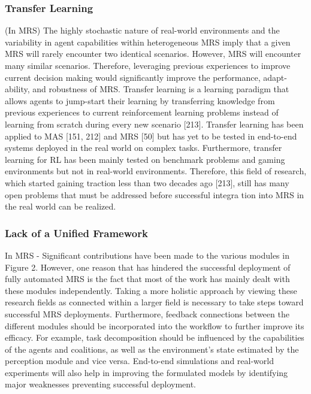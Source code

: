 \documentclass{article}
\begin{document}
				\subsubsection{Transfer Learning} 
				(In MRS) The highly stochastic nature of real-world environments and the variability in agent capabilities within heterogeneous MRS imply that a given MRS will rarely encounter two identical scenarios. However, MRS will encounter many similar scenarios. Therefore, leveraging previous experiences to improve current decision making would significantly improve the performance, adapt-
				ability, and robustness of MRS. Transfer learning is a learning paradigm that allows agents to jump-start their learning by transferring knowledge from previous experiences to current reinforcement learning problems instead of learning from scratch during every new scenario \cite{rizk-2019-cooperative-heterogeneous-multi-robot-systems-a-survey}[213]. Transfer learning has been applied to MAS \cite{rizk-2019-cooperative-heterogeneous-multi-robot-systems-a-survey}[151, 212] and MRS \cite{rizk-2019-cooperative-heterogeneous-multi-robot-systems-a-survey}[50] but has yet to be tested in
				end-to-end systems deployed in the real world on complex tasks. Furthermore, transfer learning for RL has been mainly tested on benchmark problems and gaming environments but not in real-world environments. Therefore, this field of research, which started gaining traction less than two decades ago \cite{rizk-2019-cooperative-heterogeneous-multi-robot-systems-a-survey}[213], still has many open problems that must be addressed before successful integra	tion into MRS in the real world can be realized.
				
				\subsubsection{Lack of a Unified Framework}
				In MRS - Significant contributions have been made to the various modules in Figure \cite{rizk-2019-cooperative-heterogeneous-multi-robot-systems-a-survey}2. However, one reason that has hindered the successful deployment of fully automated MRS is the fact that most of the work has mainly dealt with these modules independently. Taking a more holistic approach by viewing these research fields as connected within a larger field is necessary to take steps toward successful MRS deployments. Furthermore, feedback connections between the different modules should be incorporated into the workflow to further improve its efficacy. For example, task decomposition should be influenced by the capabilities of the agents and coalitions, as well as the environment’s state estimated by the perception module and vice versa. End-to-end simulations
				and real-world experiments will also help in improving the formulated models by identifying major weaknesses preventing successful deployment.
				
\end{document}
